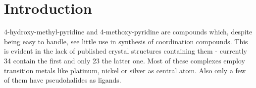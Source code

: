 \chapter{Introduction}





4-hydroxy-methyl-pyridine and 4-methoxy-pyridine are compounds which, despite being easy to handle, see little use in synthesis of coordination compounds. This is evident in the lack of published crystal structures containing them - currently 34 contain the first and only 23 the latter one. \cite{ccdc} Most of these complexes employ transition metals like platinum, nickel or silver as central atom. Also only a few of them have pseudohalides as ligands.\\


\begin{figure}[htpb!]
\centering
{}
\quad
{}

\end{figure}
